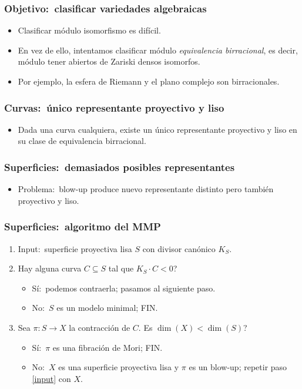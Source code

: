\documentclass[12pt]{beamer}
\begin{document}
\begin{frame}
  \frametitle{Objetivo:~clasificar variedades algebraicas}
  \begin{itemize}
    \item Clasificar módulo isomorfismo es difícil.
      \pause
    \item En vez de ello, intentamos clasificar módulo \textit{equivalencia birracional}, es decir, módulo tener abiertos de Zariski densos isomorfos.
      \pause
    \item Por ejemplo, la esfera de Riemann y el plano complejo son birracionales.
  \end{itemize}
\end{frame}

\begin{frame}
  \frametitle{Curvas:~único representante proyectivo y liso}
  \begin{itemize}
    \item Dada una curva cualquiera, existe un único representante proyectivo y liso en su clase de equivalencia birracional.
  \end{itemize}
\end{frame}

\begin{frame}
  \frametitle{Superficies:~demasiados posibles representantes}
  \begin{itemize}
    \item Problema:~blow-up produce nuevo representante distinto pero también proyectivo y liso.
  \end{itemize}
\end{frame}

\begin{frame}
  \frametitle{Superficies:~algoritmo del MMP}
  \begin{enumerate}
    \item Input:~superficie proyectiva lisa $S$ con divisor canónico $K_{S}$.\label{input}
      \pause
    \item Hay alguna curva $C \subseteq S$ tal que $K_{S}\cdot C < 0$?
      \pause
      \begin{itemize}
        \item Sí:~podemos contraerla; pasamos al siguiente paso.
        \item No:~$S$ es un modelo minimal; FIN.
      \end{itemize}
      \pause
    \item Sea $\pi \colon S \to X$ la contracción de $C$.
      Es $\dim(X) < \dim(S)$?
      \pause
      \begin{itemize}
        \item Sí:~$\pi$ es una fibración de Mori; FIN.
        \item No:~$X$ es una superficie proyectiva lisa y $\pi$ es un blow-up; repetir paso \ref{input} con $X$.
      \end{itemize}
  \end{enumerate}
\end{frame}
\end{document}
